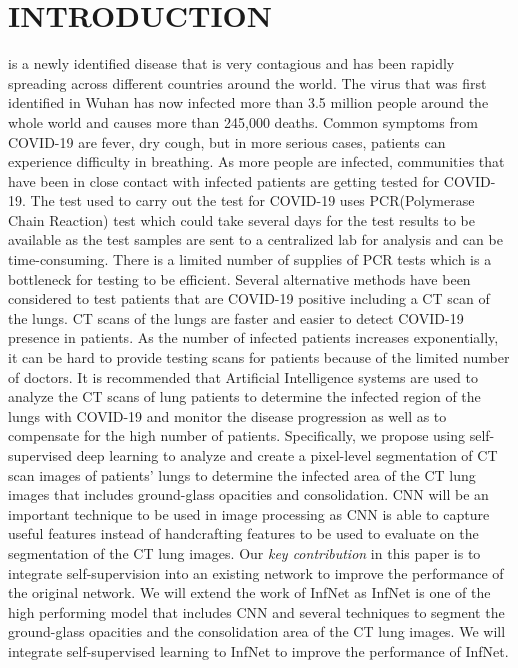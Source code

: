 \section{INTRODUCTION}

 is a newly identified disease that is very contagious and has been rapidly spreading across different countries around the world. The virus that was first identified in Wuhan has now infected more than 3.5 million people around the whole world and causes more than 245,000 deaths. Common symptoms from COVID-19 are fever, dry cough, but in more serious cases, patients can experience difficulty in breathing. As more people are infected, communities that have been in close contact with infected patients are getting tested for COVID-19. The test used to carry out the test for COVID-19 uses PCR(Polymerase Chain Reaction) test which could take several days for the test results to be available as the test samples are sent to a centralized lab for analysis and can be time-consuming. There is a limited number of supplies of PCR tests which is a bottleneck for testing to be efficient. Several alternative methods have been considered to test patients that are COVID-19 positive including a CT scan of the lungs. CT scans of the lungs are faster and easier to detect COVID-19 presence in patients. As the number of infected patients increases exponentially, it can be hard to provide testing scans for patients because of the limited number of doctors. It is recommended that Artificial Intelligence systems are used to analyze the CT scans of lung patients to determine the infected region of the lungs with COVID-19 and monitor the disease progression as well as to compensate for the high number of patients. Specifically, we propose using self-supervised deep learning to analyze and create a pixel-level segmentation of CT scan images of patients’ lungs to determine the infected area of the CT lung images that includes ground-glass opacities and consolidation. CNN \cite{ref29} will be an important technique to be used in image processing as CNN is able to capture useful features instead of handcrafting features to be used to evaluate on the segmentation of the CT lung images. Our \textit{key contribution} in this paper is to integrate self-supervision into an existing network to improve the performance of the original network. We will extend the work of InfNet as InfNet is one of the high performing model that includes CNN and several techniques to segment the ground-glass opacities and the consolidation area of the CT lung images. We will integrate self-supervised learning to InfNet to improve the performance of InfNet.